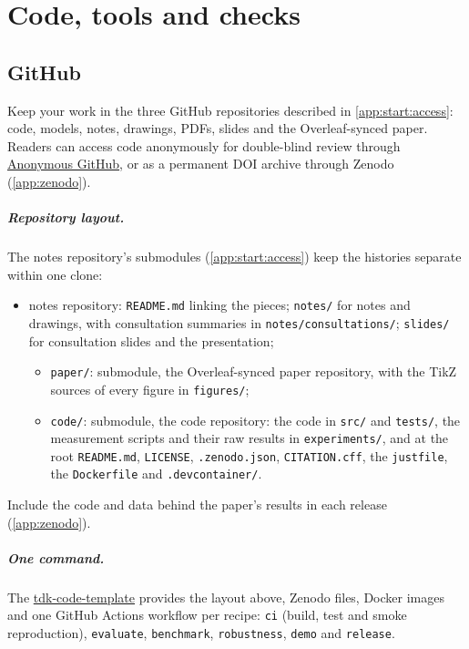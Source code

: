 \chapter{Code, tools and checks}\label{app:code}
\section{GitHub}\label{app:code:github}
Keep your work in the three GitHub repositories described in \cref{app:start:access}: code, models, notes, drawings, PDFs, slides and the Overleaf-synced paper. Readers can access code anonymously for double-blind review through \href{https://anonymous.4open.science/}{Anonymous GitHub}, or as a permanent DOI archive through Zenodo (\cref{app:zenodo}).

\paragraph{Repository layout.} The notes repository's submodules (\cref{app:start:access}) keep the histories separate within one clone:
\begin{itemize}[noitemsep]
  \item notes repository: \texttt{README.md} linking the pieces; \texttt{notes/} for notes and drawings, with consultation summaries in \texttt{notes/consultations/}; \texttt{slides/} for consultation slides and the presentation;
  \begin{itemize}[noitemsep]
    \item \texttt{paper/}: submodule, the Overleaf-synced paper repository, with the TikZ sources of every figure in \texttt{figures/};
    \item \texttt{code/}: submodule, the code repository: the code in \texttt{src/} and \texttt{tests/}, the measurement scripts and their raw results in \texttt{experiments/}, and at the root \texttt{README.md}, \texttt{LICENSE}, \texttt{.zenodo.json}, \texttt{CITATION.cff}, the \texttt{justfile}, the \texttt{Dockerfile} and \texttt{.devcontainer/}.
  \end{itemize}
\end{itemize}
Include the code and data behind the paper's results in each release (\cref{app:zenodo}).

\paragraph{One command.} The \href{https://github.com/BlackLight54/tdk-code-template}{tdk-code-template} provides the layout above, Zenodo files, Docker images and one GitHub Actions workflow per recipe: \texttt{ci} (build, test and smoke reproduction), \texttt{evaluate}, \texttt{benchmark}, \texttt{robustness}, \texttt{demo} and \texttt{release}.

